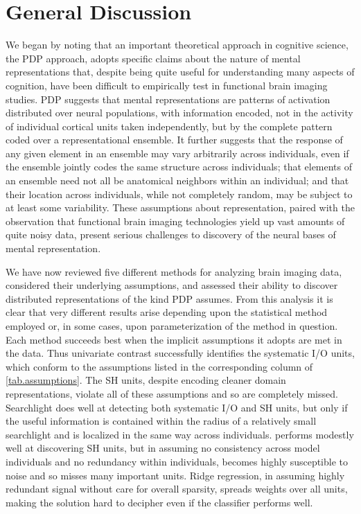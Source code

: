 \section{General Discussion}

We began by noting that an important theoretical approach in cognitive science, the PDP approach, adopts specific claims about the nature of mental representations that, despite being quite useful for understanding many aspects of cognition, have been difficult to empirically test in functional brain imaging studies. PDP suggests that mental representations are patterns of activation distributed over neural populations, with information encoded, not in the activity of individual cortical units taken independently, but by the complete pattern coded over a representational ensemble. It further suggests that the response of any given element in an ensemble may vary arbitrarily across individuals, even if the ensemble jointly codes the same structure across individuals; that elements of an ensemble need not all be anatomical neighbors within an individual; and that their location across individuals, while not completely random, may be subject to at least some variability. These assumptions about representation, paired with the observation that functional brain imaging technologies yield up vast amounts of quite noisy data, present serious challenges to  discovery of the neural bases of mental representation.

We have now reviewed five different methods for analyzing brain imaging data, considered their underlying assumptions, and assessed their ability to discover distributed representations of the kind PDP assumes. From this analysis it is clear that very different results arise depending upon the statistical method employed or, in some cases, upon parameterization of the method in question. Each method succeeds best when the implicit assumptions it adopts are met in the data. Thus univariate contrast successfully identifies the systematic I/O units, which conform to the assumptions listed in the corresponding column of \ref{tab.assumptions}. The SH units, despite encoding cleaner domain representations, violate all of these assumptions and so are completely missed. Searchlight does well at detecting both systematic I/O and SH units, but only if the useful information is contained within the radius of a relatively small searchlight and is localized in the same way across individuals. {\lasso} performs modestly well at discovering SH units, but in assuming no consistency across model individuals and no redundancy within individuals, becomes highly susceptible to noise and so misses many important units. Ridge regression, in assuming highly redundant signal without care for overall sparsity, spreads weights over all units, making the solution hard to decipher even if the classifier performs well.

